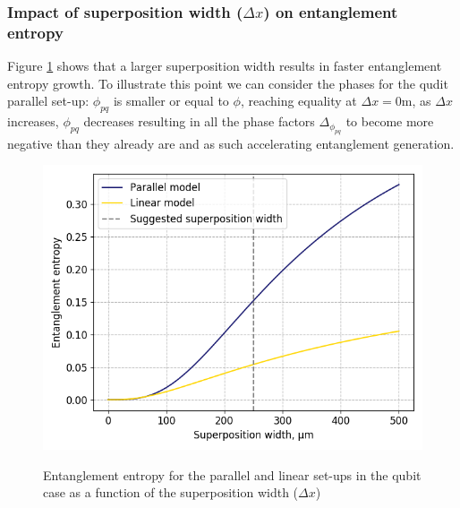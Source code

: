 \documentclass[%
 reprint,
 superscriptaddress,
 amsmath,
 amssymb,
 aps,
 longbibliography
]{revtex4-2}
\begin{document}
\begin{appendices}
\subsubsection{Impact of superposition width ($\Delta x$) on entanglement  entropy\label{sec:superposition_width}}

\indent Figure \ref{fig:superposition_width} shows that a larger superposition width results in faster entanglement entropy growth. To illustrate this point we can consider the phases for the qudit parallel set-up: $\phi_{pq}$ is smaller or equal to $\phi$, reaching equality at $\Delta x=0$m, as $\Delta x$ increases, $\phi_{pq}$ decreases resulting in all the phase factors $\Delta_{\phi_{pq}}$ to become more negative than they already are and as such accelerating entanglement generation. 
    \begin{figure}
	\centering
	    	\includegraphics[width=1.0\columnwidth]{VNE_delta_x_comp.png}
	    	\caption{Entanglement entropy for the parallel and linear set-ups in the qubit case as a function of the superposition width ($\Delta x$)}\par\medskip \label{fig:superposition_width}
	\end{figure}


\end{appendices}
\end{document}
